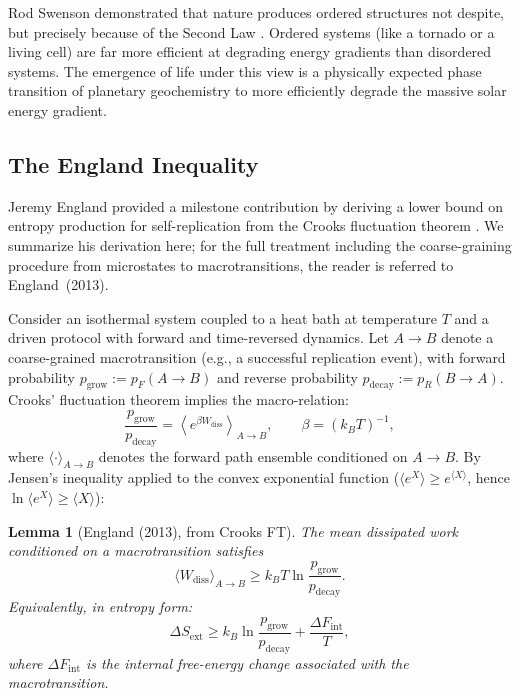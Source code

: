 \documentclass[12pt,a4paper]{article}
\newtheorem{lemma}{Lemma}
\theoremstyle{remark}
\begin{document}
Rod Swenson demonstrated that nature produces ordered structures not despite, but precisely because of the Second Law \citep{ThermodynamicsLife}. Ordered systems (like a tornado or a living cell) are far more efficient at degrading energy gradients than disordered systems. The emergence of life under this view is a physically expected phase transition of planetary geochemistry to more efficiently degrade the massive solar energy gradient.

\subsection{The England Inequality}

Jeremy England provided a milestone contribution by deriving a lower bound on entropy production for self-replication from the Crooks fluctuation theorem \citep{Crooks1999,England2013}. We summarize his derivation here; for the full treatment including the coarse-graining procedure from microstates to macrotransitions, the reader is referred to England~(2013).

Consider an isothermal system coupled to a heat bath at temperature $T$ and a driven protocol with forward and time-reversed dynamics. Let $A \to B$ denote a coarse-grained macrotransition (e.g., a successful replication event), with forward probability $p_{\mathrm{grow}} := p_F(A \to B)$ and reverse probability $p_{\mathrm{decay}} := p_R(B \to A)$. Crooks' fluctuation theorem implies the macro-relation:
\begin{equation}
\frac{p_{\mathrm{grow}}}{p_{\mathrm{decay}}} = \left\langle e^{\beta W_{\mathrm{diss}}} \right\rangle_{A \to B}, \qquad \beta = (k_B T)^{-1},
\end{equation}
where $\langle \cdot \rangle_{A \to B}$ denotes the forward path ensemble conditioned on $A \to B$. By Jensen's inequality applied to the convex exponential function ($\langle e^X \rangle \geq e^{\langle X \rangle}$, hence $\ln \langle e^X \rangle \geq \langle X \rangle$):

\begin{lemma}[England (2013), from Crooks FT]
\label{lem:england}
The mean dissipated work conditioned on a macrotransition satisfies
\begin{equation}
\langle W_{\mathrm{diss}} \rangle_{A \to B} \geq k_B T \ln \frac{p_{\mathrm{grow}}}{p_{\mathrm{decay}}}.
\end{equation}
Equivalently, in entropy form:
\begin{equation}
\Delta S_{\mathrm{ext}} \geq k_B \ln \frac{p_{\mathrm{grow}}}{p_{\mathrm{decay}}} + \frac{\Delta F_{\mathrm{int}}}{T},
\end{equation}
where $\Delta F_{\mathrm{int}}$ is the internal free-energy change associated with the macrotransition.
\end{lemma}
\end{document}
